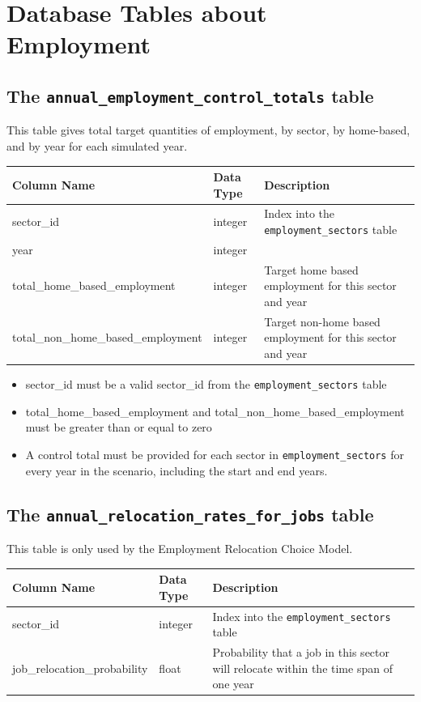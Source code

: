 \section{Database Tables about Employment}
\label{sec:employment-tables}

\subsection{The {\tt annual_employment_control_totals} table}

This table gives total target quantities of employment, by sector, by
home-based, and by year for each simulated year.

\begin{tabular}{|l|l|l|}
\hline
\textbf{Column Name} & \textbf{Data Type} & \textbf{Description} \\

\hline
sector_id & integer & Index into the \verb|employment_sectors| table  \\
\hline
year & integer & \\
\hline
total_home_based_employment & integer &
Target home based employment for this sector and year \\
\hline
total_non_home_based_employment & integer &
Target non-home based employment for this sector and year   \\
\hline
\end{tabular}

\begin{itemize}
\tight
\item sector_id must be a valid sector_id from the \verb|employment_sectors|
table
\item total_home_based_employment and total_non_home_based_employment must be
greater than or equal to zero
\item A control total must be provided for each sector in \verb|employment_sectors| for every year in the scenario, including the start and end
years.
\end{itemize}

\subsection{The {\tt annual_relocation_rates_for_jobs} table}

This table is only used by the Employment Relocation Choice Model. \modelsindex

\begin{tabular}{|l|l|p{4in}|}
\hline
\textbf{Column Name} & \textbf{Data Type} & \textbf{Description} \\
\hline
sector_id & integer &  Index into the \verb|employment_sectors| table   \\
\hline
job_relocation_probability & float & Probability that a job in this sector will relocate within the time span of one year  \\
\hline
\end{tabular}

